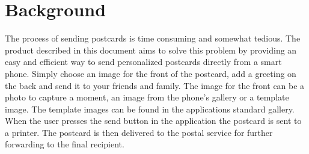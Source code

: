 \documentclass[10pt,a4paper]{article}
\begin{document}
\section{Background}
The process of sending postcards is time consuming and somewhat tedious. The product described in this document aims to solve this problem by providing an easy and efficient way to send personalized postcards directly from a smart phone. Simply choose an image for the front of the postcard, add a greeting on the back and send it to your friends and family. The image for the front can be a photo to capture a moment, an image from the phone's gallery or a template image. The template images can be found in the applications standard gallery. When the user presses the send button in the application the postcard is sent to a printer. The postcard is then delivered to the postal service for further forwarding to the final recipient. 

%
%

\end{document}
